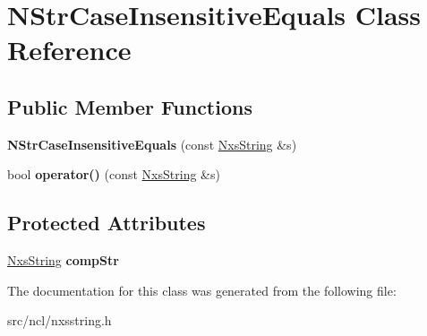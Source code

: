 \hypertarget{classNStrCaseInsensitiveEquals}{
\section{NStrCaseInsensitiveEquals Class Reference}
\label{classNStrCaseInsensitiveEquals}
}
\subsection*{Public Member Functions}
\begin{DoxyCompactItemize}
\item 
\hypertarget{classNStrCaseInsensitiveEquals_a07277f6ad9a09a10fa51894fe99909d3}{
{\bfseries NStrCaseInsensitiveEquals} (const \hyperlink{classNxsString}{NxsString} \&s)}
\label{classNStrCaseInsensitiveEquals_a07277f6ad9a09a10fa51894fe99909d3}

\item 
\hypertarget{classNStrCaseInsensitiveEquals_ab0538585efbf2bf3195b47a7a014a49c}{
bool {\bfseries operator()} (const \hyperlink{classNxsString}{NxsString} \&s)}
\label{classNStrCaseInsensitiveEquals_ab0538585efbf2bf3195b47a7a014a49c}

\end{DoxyCompactItemize}
\subsection*{Protected Attributes}
\begin{DoxyCompactItemize}
\item 
\hypertarget{classNStrCaseInsensitiveEquals_ad9362da48b09a005c82612ee3d8b6840}{
\hyperlink{classNxsString}{NxsString} {\bfseries compStr}}
\label{classNStrCaseInsensitiveEquals_ad9362da48b09a005c82612ee3d8b6840}

\end{DoxyCompactItemize}


The documentation for this class was generated from the following file:\begin{DoxyCompactItemize}
\item 
src/ncl/nxsstring.h\end{DoxyCompactItemize}
